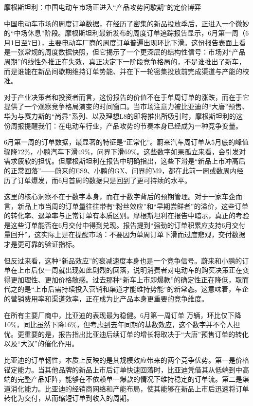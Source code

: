 \documentclass[11pt]{ctexart}
\begin{document}
摩根斯坦利：中国电动车市场正进入“产品攻势间歇期”的定价博弈

中国电动车市场的周度订单数据，在经历了密集的新品投放季后，正进入一个微妙的“中场休息”阶段。摩根斯坦利最新发布的周度订单追踪报告显示，6月第一周（6月1日至7日），主要电动车厂商的周度订单普遍出现环比下滑。这份报告表面上看是一张常规的周度数据快照，但它揭示了一个更深层的结构性信号：市场对“产品周期”的线性外推正在失效，真正决定下一阶段竞争格局的，不是谁推出了新车，而是谁能在新品间歇期维持订单势能、并在下一轮密集投放前完成渠道与产能的校准。

对于产业决策者和投资者而言，这份报告的价值不在于单周订单的涨跌，而在于它提供了一个观察竞争格局演变的时间窗口。当市场注意力被比亚迪的“大唐”预售、华为与赛力斯的“尚界”系列、以及理想L8的即将推出所吸引时，摩根斯坦利的这份周报提醒我们：在电动车行业，产品攻势的节奏本身已经成为一种竞争变量。

6月第一周的订单数据，最显著的特征是“正常化”。蔚来汽车周订单从5月底的峰值骤降72\%，小鹏汽车下滑49\%，问界下滑69\%。这些数字如果孤立来看，会引发对需求疲软的担忧。但摩根斯坦利在报告中明确指出，这些下滑是“新品上市冲高后的正常回落”——蔚来的ES9、小鹏的GX、问界的M9，都在此前一周或数周内经历了订单爆发，而6月首周的数据只是回到了更可持续的水平。

这里的核心洞察不在于数字本身，而在于数字背后的预期管理。对于一家车企而言，新品上市当周的订单量往往带有“粉丝效应”和“早期尝鲜者”的溢价，这些订单的转化率、退单率与正常订单有本质区别。摩根斯坦利在报告中暗示，真正的考验是这些订单能否在6月交付中得到兑现。报告提到“强劲的订单积累应支持6月交付量回升”，这实际上是在提醒市场：不要因为单周订单下滑而过度悲观，交付数据才是更可靠的验证指标。

但反过来看，这种“新品效应”的衰减速度本身也是一个竞争信号。蔚来和小鹏的订单在上市后仅一周就出现如此剧烈的回落，说明消费者对电动车的购买决策正在变得更加理性、更加价格敏感。过去那种“新车上市即爆款”的确定性正在降低，取而代之的是“上市后需持续投入营销和渠道才能维持势能”的新常态。这意味着，车企的营销费用率和渠道效率，正在成为比产品本身更重要的竞争维度。

在所有主要厂商中，比亚迪的表现最为稳健。6月第一周订单 万辆，环比仅下降10\%，同比虽然下降16\%，但考虑到去年同期的基数效应，这个数字并不令人担忧。更重要的是，报告指出比亚迪后续订单的增长将取决于“大唐”预售订单的转化以及“大汉”的催化作用。

比亚迪的订单韧性，本质上反映的是其规模效应带来的两个竞争优势。第一是价格锚定能力。当其他品牌的新品上市后订单快速回落时，比亚迪凭借其从低端到中高端的完整产品矩阵，能够在不依赖单一爆款的情况下维持稳定的订单流。第二是渠道消化能力。比亚迪的经销商网络和产能布局，使其能够在新品上市后迅速将订单转化为交付，从而缩短订单到收入的周期。
\end{document}
